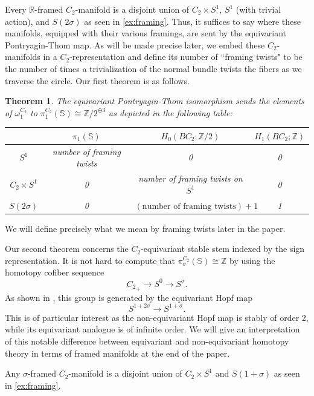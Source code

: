 \documentclass[11pt]{amsart}
\newcommand{\R}{\mathbb R}
\newcommand{\Z}{\mathbb{Z}}
\newcommand{\Sph}{\mathbb{S}}
\theoremstyle{plain}   %
\newtheorem{thm}{Theorem}[section] %
\theoremstyle{definition}
\theoremstyle{remark}
\numberwithin{equation}{section}
\begin{document}
Every $\R$-framed $C_2$-manifold is a disjoint union of $C_2\times S^1$, $S^1$ (with trivial action), and $S(2\sigma)$ as seen in \cref{ex:framing}. Thus, it suffices to say where these manifolds, equipped with their various framings, are sent by the equivariant Pontryagin-Thom map. As will be made precise later, we embed these $C_2$-manifolds in a $C_2$-representation and define its number of ``framing twists" to be the number of times a trivialization of the normal bundle twists the fibers as we traverse the circle. Our first theorem is as follows. 

\begin{thm}\label{thm:theorem 1}
The equivariant Pontryagin-Thom isomorphism sends the elements of $\omega_1^{C_2}$ to $\pi_1^{C_2}(\Sph)\cong \Z/2^{\oplus 3}$ as depicted in the following table:

\begin{center}
\begin{tabular}{ |c | c | c | c| }
 \hline
  & $\pi_1(\Sph)$ & $H_0(BC_2;\Z/2)$ & $H_1(BC_2;\Z)$ \\
 \hline 
 $S^1$ & number of framing twists & 0 & 0 \\
 \hline 
 $C_2\times S^1$ & 0 & number of framing twists on $S^1$ & 0 \\ 
 \hline 
 $S(2\sigma)$ & 0 & $(\text{number of framing twists})+1$ & 1 \\
 \hline  
\end{tabular}
\end{center} 
\end{thm}

We will define precisely what we mean by framing twists later in the paper.

Our second theorem concerns the $C_2$-equivariant stable stem indexed by the sign representation. It is not hard to compute that $\pi_\sigma^{C_2}(\Sph)\cong \Z$ by using the homotopy cofiber sequence
\[
{C_2}_+\to S^0\to S^\sigma.
\] 
As shown in \cite{morel, dugger_isaksen}, this group is generated by the equivariant Hopf map 
\[
S^{1+2\sigma}\to S^{1+\sigma}.
\]
This is of particular interest as the non-equivariant Hopf map is stably of order 2, while its equivariant analogue is of infinite order. We will give an interpretation of this notable difference between equivariant and non-equivariant homotopy theory in terms of framed manifolds at the end of the paper. 

Any $\sigma$-framed $C_2$-manifold is a disjoint union of $C_2\times S^1$ and $S(1+\sigma)$ as seen in \cref{ex:framing}.
\end{document}
